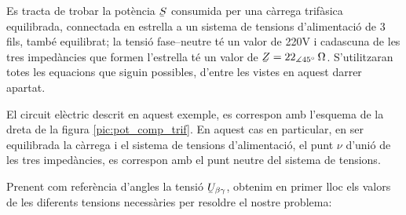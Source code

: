 \begin{exemple}
    Es tracta de trobar la pot\`{e}ncia $\cmplx{S}$ consumida per una c\`{a}rrega
    trif\`{a}sica equilibrada, connectada en estrella a un sistema de tensions
    d'alimentaci\'{o}  de 3 fils, tamb\'{e} equilibrat; la tensi\'{o} fase--neutre
    t\'{e} un valor de 220\unit{V} i cadascuna de les tres  imped\`{a}ncies
    que formen l'estrella t\'{e} un valor de $\cmplx{Z}=22_{\measuredangle
    45\degree}\unit{\ohm}$. S'utilitzaran totes les equacions que
    siguin possibles, d'entre les vistes en aquest darrer apartat.

    El circuit el\`{e}ctric descrit en aquest exemple, es correspon amb
    l'esquema de la dreta de la figura \vref{pic:pot_comp_trif}. En
    aquest cas en particular, en ser equilibrada la c\`{a}rrega i el
    sistema de tensions d'alimentaci\'{o}, el punt $\nu$ d'uni\'{o} de  les tres imped\`{a}ncies, es
    correspon amb el punt neutre del sistema de tensions.

    Prenent com refer\`{e}ncia d'angles la tensi\'{o}
    $\cmplx{U}_{\beta\gamma}$, obtenim en primer lloc els valors de
    les diferents tensions necess\`{a}ries per resoldre el nostre
    problema:


\end{exemple}
